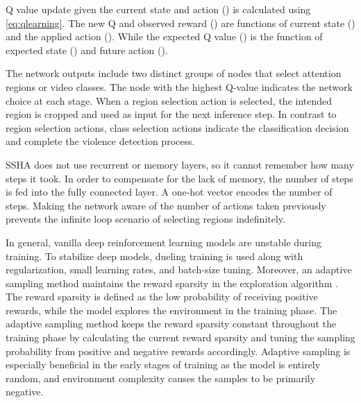\documentclass[review]{elsarticle}
\begin{document}
{Q value update given the current state and action () is calculated using} \autoref{eq:qlearning}{. The new Q and observed reward () are functions of current state () and the applied action (). While the expected Q value () is the function of expected state () and future action ().
}

The network outputs include two distinct groups of nodes that select attention regions or video classes. The node with the highest Q-value indicates the network choice at each stage. When a region selection action is selected, the intended region is cropped and used as input for the next inference step. In contrast to region selection actions, class selection actions indicate the classification decision and complete the violence detection process.

SSHA does not use recurrent or memory layers, so it cannot remember how many steps it took. In order to compensate for the lack of memory, the number of steps is fed into the fully connected layer. A one-hot vector encodes the number of steps. Making the network aware of the number of actions taken previously prevents the infinite loop scenario of selecting regions indefinitely.

In general, vanilla deep reinforcement learning models are unstable during training. To stabilize deep models, dueling training {\citep{wang2016dueling}} is used along with regularization, small learning rates, and batch-size tuning. Moreover, an adaptive sampling method maintains the reward sparsity in the  exploration algorithm \citep{sutton2018reinforcement}. The reward sparsity is defined as the low probability of receiving positive rewards, while the model explores the environment in the training phase. The adaptive sampling method keeps the reward sparsity constant throughout the training phase by calculating the current reward sparsity and tuning the sampling probability from positive and negative rewards accordingly. Adaptive sampling is especially beneficial in the early stages of training as the model is entirely random, and environment complexity causes the samples to be primarily negative.
\end{document}
